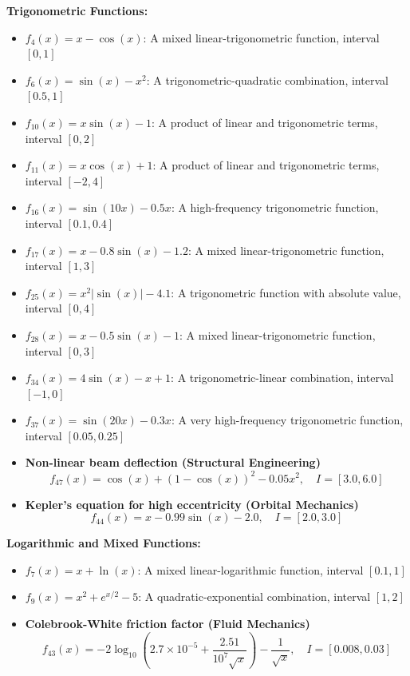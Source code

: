 \documentclass[amsmath, amssymb, aps]{revtex4-2}
\begin{document}
\textbf{Trigonometric Functions:}
\begin{itemize}
\item $f_4(x) = x - \cos(x)$: A mixed linear-trigonometric function, interval $[0, 1]$
\item $f_6(x) = \sin(x) - x^2$: A trigonometric-quadratic combination, interval $[0.5, 1]$
\item $f_{10}(x) = x \sin(x) - 1$: A product of linear and trigonometric terms, interval $[0, 2]$
\item $f_{11}(x) = x \cos(x) + 1$: A product of linear and trigonometric terms, interval $[-2, 4]$
\item $f_{16}(x) = \sin(10x) - 0.5x$: A high-frequency trigonometric function, interval $[0.1, 0.4]$
\item $f_{17}(x) = x - 0.8\sin(x) - 1.2$: A mixed linear-trigonometric function, interval $[1, 3]$
\item $f_{25}(x) = x^2 |\sin(x)| - 4.1$: A trigonometric function with absolute value, interval $[0, 4]$
\item $f_{28}(x) = x - 0.5\sin(x) - 1$: A mixed linear-trigonometric function, interval $[0, 3]$
\item $f_{34}(x) = 4\sin(x) - x + 1$: A trigonometric-linear combination, interval $[-1, 0]$
\item $f_{37}(x) = \sin(20x) - 0.3x$: A very high-frequency trigonometric function, interval $[0.05, 0.25]$
\item \textbf{Non-linear beam deflection (Structural Engineering)} \[ f_{47}(x) = \cos(x) + (1 - \cos(x))^2 - 0.05 x^2, \quad I = [3.0, 6.0] \]
\item \textbf{Kepler's equation for high eccentricity (Orbital Mechanics)} \[ f_{44}(x) = x - 0.99 \sin(x) - 2.0, \quad I = [2.0, 3.0] \]
\end{itemize}

\textbf{Logarithmic and Mixed Functions:}
\begin{itemize}
\item $f_7(x) = x + \ln(x)$: A mixed linear-logarithmic function, interval $[0.1, 1]$
\item $f_9(x) = x^2 + e^{x/2} - 5$: A quadratic-exponential combination, interval $[1, 2]$
\item \textbf{Colebrook-White friction factor (Fluid Mechanics)} \[ f_{43}(x) = -2 \log_{10}\left(2.7 \times 10^{-5} + \frac{2.51}{10^7 \sqrt{x}}\right) - \frac{1}{\sqrt{x}}, \quad I = [0.008, 0.03] \]
\end{itemize}
\end{document}
